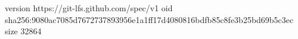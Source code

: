 version https://git-lfs.github.com/spec/v1
oid sha256:9080ac7085d7672737893956e1a1ff17d4080816bdfb85c8fe3b25bd69b5c3ec
size 32864
